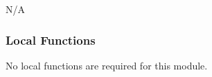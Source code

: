 \documentclass[12pt, titlepage]{article}
\begin{document}

N/A



\subsubsection{Local Functions}
No local functions are required for this module.
\end{document}
